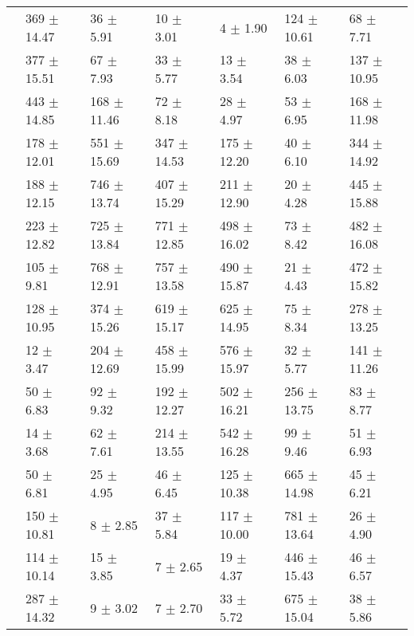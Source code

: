 \begin{table}
{\begin{tabular}[t]{rllllll}
\multirow{-2}{*}{\raggedleft\arraybackslash 7} & 369 $\pm$ 14.47 & 36 $\pm$ 5.91 & 10 $\pm$ 3.01 & 4 $\pm$ 1.90 & 124 $\pm$ 10.61 & 68 $\pm$ 7.71\\
\cmidrule{1-7}
 & 377 $\pm$ 15.51 & 67 $\pm$ 7.93 & 33 $\pm$ 5.77 & 13 $\pm$ 3.54 & 38 $\pm$ 6.03 & 137 $\pm$ 10.95\\

\multirow{-2}{*}{\raggedleft\arraybackslash 8} & 443 $\pm$ 14.85 & 168 $\pm$ 11.46 & 72 $\pm$ 8.18 & 28 $\pm$ 4.97 & 53 $\pm$ 6.95 & 168 $\pm$ 11.98\\
\cmidrule{1-7}
 & 178 $\pm$ 12.01 & 551 $\pm$ 15.69 & 347 $\pm$ 14.53 & 175 $\pm$ 12.20 & 40 $\pm$ 6.10 & 344 $\pm$ 14.92\\

\multirow{-2}{*}{\raggedleft\arraybackslash 9} & 188 $\pm$ 12.15 & 746 $\pm$ 13.74 & 407 $\pm$ 15.29 & 211 $\pm$ 12.90 & 20 $\pm$ 4.28 & 445 $\pm$ 15.88\\
\cmidrule{1-7}
 & 223 $\pm$ 12.82 & 725 $\pm$ 13.84 & 771 $\pm$ 12.85 & 498 $\pm$ 16.02 & 73 $\pm$ 8.42 & 482 $\pm$ 16.08\\

\multirow{-2}{*}{\raggedleft\arraybackslash 10} & 105 $\pm$ 9.81 & 768 $\pm$ 12.91 & 757 $\pm$ 13.58 & 490 $\pm$ 15.87 & 21 $\pm$ 4.43 & 472 $\pm$ 15.82\\
\cmidrule{1-7}
 & 128 $\pm$ 10.95 & 374 $\pm$ 15.26 & 619 $\pm$ 15.17 & 625 $\pm$ 14.95 & 75 $\pm$ 8.34 & 278 $\pm$ 13.25\\

\multirow{-2}{*}{\raggedleft\arraybackslash 11} & 12 $\pm$ 3.47 & 204 $\pm$ 12.69 & 458 $\pm$ 15.99 & 576 $\pm$ 15.97 & 32 $\pm$ 5.77 & 141 $\pm$ 11.26\\
\cmidrule{1-7}
 & 50 $\pm$ 6.83 & 92 $\pm$ 9.32 & 192 $\pm$ 12.27 & 502 $\pm$ 16.21 & 256 $\pm$ 13.75 & 83 $\pm$ 8.77\\

\multirow{-2}{*}{\raggedleft\arraybackslash 12} & 14 $\pm$ 3.68 & 62 $\pm$ 7.61 & 214 $\pm$ 13.55 & 542 $\pm$ 16.28 & 99 $\pm$ 9.46 & 51 $\pm$ 6.93\\
\cmidrule{1-7}
 & 50 $\pm$ 6.81 & 25 $\pm$ 4.95 & 46 $\pm$ 6.45 & 125 $\pm$ 10.38 & 665 $\pm$ 14.98 & 45 $\pm$ 6.21\\

\multirow{-2}{*}{\raggedleft\arraybackslash 13} & 150 $\pm$ 10.81 & 8 $\pm$ 2.85 & 37 $\pm$ 5.84 & 117 $\pm$ 10.00 & 781 $\pm$ 13.64 & 26 $\pm$ 4.90\\
\cmidrule{1-7}
 & 114 $\pm$ 10.14 & 15 $\pm$ 3.85 & 7 $\pm$ 2.65 & 19 $\pm$ 4.37 & 446 $\pm$ 15.43 & 46 $\pm$ 6.57\\

\multirow{-2}{*}{\raggedleft\arraybackslash 14} & 287 $\pm$ 14.32 & 9 $\pm$ 3.02 & 7 $\pm$ 2.70 & 33 $\pm$ 5.72 & 675 $\pm$ 15.04 & 38 $\pm$ 5.86\\
\bottomrule
\end{tabular}}
\end{table}
